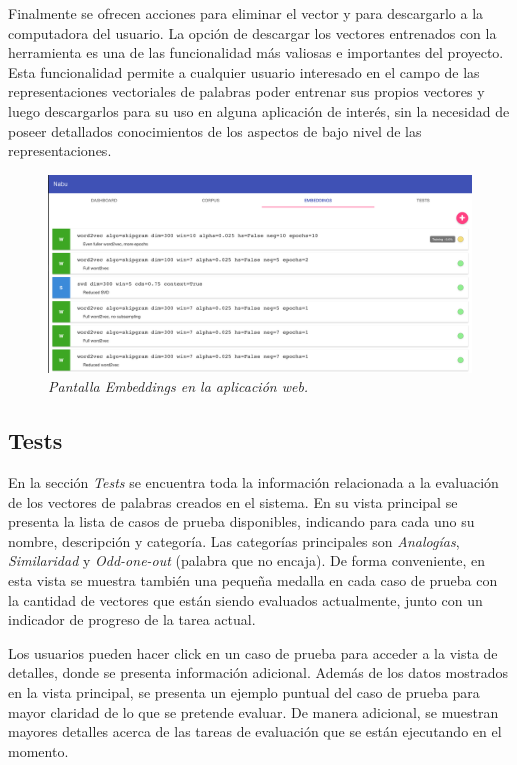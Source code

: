 Finalmente se ofrecen acciones para eliminar el vector y para descargarlo a la computadora del usuario. La
opción de descargar los vectores entrenados con la herramienta es una de las funcionalidad más valiosas e
importantes del proyecto. Esta funcionalidad permite a cualquier usuario interesado en el campo de las
representaciones vectoriales de palabras poder entrenar sus propios vectores y luego descargarlos para su
uso en alguna aplicación de interés, sin la necesidad de poseer detallados conocimientos de los aspectos de
bajo nivel de las representaciones.

\begin{figure}[h]
    \centering
    \includegraphics[width=\textwidth]{images/ui-nabu-embeddings}
    \caption{\textit{Pantalla Embeddings en la aplicación web.}}
    \label{fig:ui-nabu-embeddings}
\end{figure}

\subsection{Tests}

En la sección \textit{Tests} se encuentra toda la información relacionada a la evaluación de los vectores
de palabras creados en el sistema. En su vista principal se presenta la lista de casos de prueba
disponibles, indicando para cada uno su nombre, descripción y categoría. Las categorías principales son
\textit{Analogías}, \textit{Similaridad} y \textit{Odd-one-out} (palabra que no encaja). De forma
conveniente, en esta vista se muestra también una pequeña medalla en cada caso de prueba con la cantidad
de vectores que están siendo evaluados actualmente, junto con un indicador de progreso de la tarea actual.

Los usuarios pueden hacer click en un caso de prueba para acceder a la vista de detalles, donde se
presenta información adicional. Además de los datos mostrados en la vista principal, se presenta un
ejemplo puntual del caso de prueba para mayor claridad de lo que se pretende evaluar. De manera adicional,
se muestran mayores detalles acerca de las tareas de evaluación que se están ejecutando en el momento.

